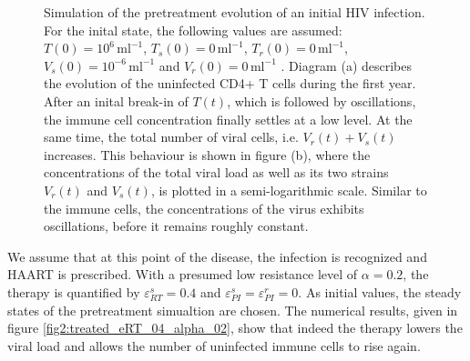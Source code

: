 \begin{figure}
    \caption[]{Simulation of the pretreatment evolution of an initial HIV infection.
    For the inital state, the following values are assumed: $T(0) = 10^{6} \, \text{ml}^{-1}$, $T_s(0) = 0 \, \text{ml}^{-1}$, 
    $T_r(0) = 0 \, \text{ml}^{-1}$, $V_s(0) = 10^{-6} \, \text{ml}^{-1}$ and $V_r(0) = 0 \, \text{ml}^{-1}$ \cite{perelson1993dynamics}.
    Diagram (a) describes the evolution of the uninfected CD4+ T cells during the first year.
    After an inital break-in of $T(t)$, which is followed by oscillations, the immune cell concentration finally settles at a low level.
    At the same time, the total number of viral cells, i.e. $V_r(t) + V_s(t)$ increases.
    This behaviour is shown in figure (b), where the concentrations of the total viral load as well as its two strains $V_r(t)$ and $V_s(t)$, is plotted in a semi-logarithmic scale.
    Similar to the immune cells, the concentrations of the virus exhibits oscillations, before it remains roughly constant.}
    \label{fig:untreated}
\end{figure}

We assume that at this point of the disease, the infection is recognized and HAART is prescribed.
With a presumed low resistance level of $\alpha = 0.2$, the therapy is quantified by $\varepsilon_{RT}^{s} = 0.4$ and $\varepsilon_{PI}^{s} = \varepsilon_{PI}^{r} = 0$.
As initial values, the steady states of the pretreatment simualtion are chosen.\newline
The numerical results, given in figure \ref{fig2:treated_eRT_04_alpha_02}, show that indeed the therapy lowers the viral load and allows the 
number of uninfected immune cells to rise again.

